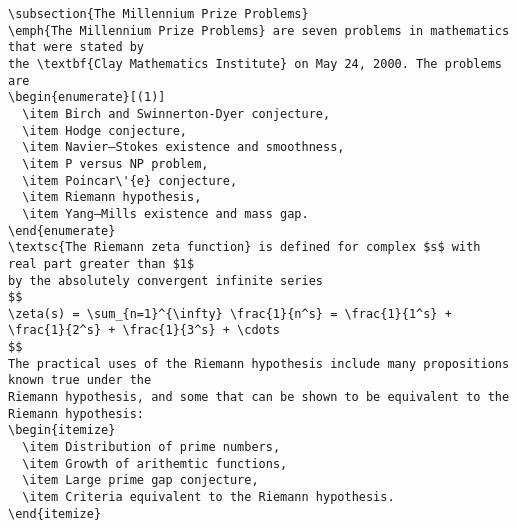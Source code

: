 \begin{verbatim}
\subsection{The Millennium Prize Problems}
\emph{The Millennium Prize Problems} are seven problems in mathematics that were stated by
the \textbf{Clay Mathematics Institute} on May 24, 2000. The problems are
\begin{enumerate}[(1)]
  \item Birch and Swinnerton-Dyer conjecture,
  \item Hodge conjecture,
  \item Navier–Stokes existence and smoothness,
  \item P versus NP problem,
  \item Poincar\'{e} conjecture,
  \item Riemann hypothesis,
  \item Yang–Mills existence and mass gap.
\end{enumerate}
\textsc{The Riemann zeta function} is defined for complex $s$ with real part greater than $1$
by the absolutely convergent infinite series
$$
\zeta(s) = \sum_{n=1}^{\infty} \frac{1}{n^s} = \frac{1}{1^s} + \frac{1}{2^s} + \frac{1}{3^s} + \cdots
$$
The practical uses of the Riemann hypothesis include many propositions known true under the
Riemann hypothesis, and some that can be shown to be equivalent to the Riemann hypothesis:
\begin{itemize}
  \item Distribution of prime numbers,
  \item Growth of arithemtic functions,
  \item Large prime gap conjecture,
  \item Criteria equivalent to the Riemann hypothesis.
\end{itemize}
\end{verbatim}
